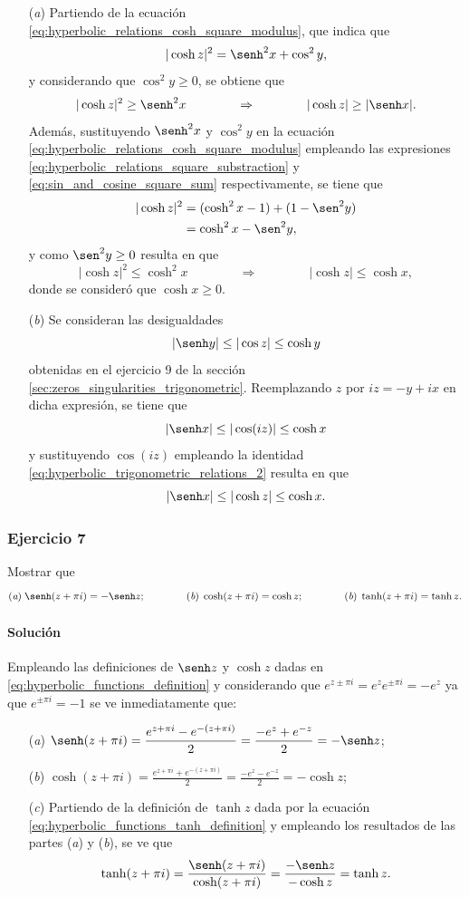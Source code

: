 \documentclass[a4paper]{report}
\begin{document}
\begin{enumerate}
 \item[(\textit{a})] Partiendo de la ecuación \ref{eq:hyperbolic_relations_cosh_square_modulus}, que indica que 
\[
 |\cosh z|^2=\senh^2x+\cos^2y,
\]
y considerando que \(\cos^2y\geq0\), se obtiene que 
\[
 |\cosh z|^2\geq\senh^2x
 \qquad\qquad\Rightarrow\qquad\qquad
 |\cosh z|\geq|\senh x|.
\]
Además, sustituyendo \(\senh^2x\) y \(\cos^2y\) en la ecuación \ref{eq:hyperbolic_relations_cosh_square_modulus} empleando las expresiones  \ref{eq:hyperbolic_relations_square_substraction} y \ref{eq:sin_and_cosine_square_sum} respectivamente, se tiene que 
\begin{align*}
 |\cosh z|^2&=(\cosh^2x-1)+(1-\sen^2y)\\ 
   &=\cosh^2x-\sen^2y,
\end{align*}
y como \(\sen^2y\geq0\) resulta en que 
\[
 |\cosh z|^2\leq\cosh^2x
 \qquad\qquad\Rightarrow\qquad\qquad
 |\cosh z|\leq\cosh x,
\]
donde se consideró que \(\cosh x\geq0\).
 \item[(\textit{b})] Se consideran las desigualdades
 \[
  |\senh y|\leq|\cos z|\leq\cosh y
 \]
 obtenidas en el ejercicio 9  de la sección \ref{sec:zeros_singularities_trigonometric}. Reemplazando \(z\) por \(iz=-y+ix\) en dicha expresión, se tiene que 
 \[
  |\senh x|\leq|\cos(iz)|\leq\cosh x
 \]
 y sustituyendo \(\cos(iz)\) empleando la identidad \ref{eq:hyperbolic_trigonometric_relations_2} resulta en que
 \[
  |\senh x|\leq|\cosh z|\leq\cosh x.
 \]
\end{enumerate}

\subsubsection{Ejercicio 7}

Mostrar que 
\[
 (\textit{a})\;\senh(z+\pi i)=-\senh z;\qquad\qquad (\textit{b})\;\cosh(z+\pi i)=\cosh z;
 \qquad\qquad (\textit{b})\;\tanh(z+\pi i)=\tanh z.
\]

\paragraph{Solución}

Empleando las definiciones de \(\senh z\) y \(\cosh z\) dadas en \ref{eq:hyperbolic_functions_definition} y considerando que \(e^{z\pm\pi i}=e^{z}e^{\pm\pi i}=-e^{z}\) ya que \(e^{\pm\pi i}=-1\) se ve inmediatamente que:
\begin{enumerate}
 \item[(\textit{a})] \(\displaystyle\senh(z+\pi i)=\frac{e^{z+\pi i}-e^{-(z+\pi i)}}{2}=\frac{-e^z+e^{-z}}{2}=-\senh z\);
 \item[(\textit{b})] \(\displaystyle\cosh(z+\pi i)=\frac{e^{z+\pi i}+e^{-(z+\pi i)}}{2}=\frac{-e^z-e^{-z}}{2}=-\cosh z\);
 \item[(\textit{c})] Partiendo de la definición de \(\tanh z\) dada por la ecuación  \ref{eq:hyperbolic_functions_tanh_definition} y empleando los resultados de las partes (\textit{a}) y (\textit{b}), se ve que 
 \[
  \tanh(z+\pi i)=\frac{\senh(z+\pi i)}{\cosh(z+\pi i)}=\frac{-\senh z}{-\cosh z}=\tanh z.
 \]
\end{enumerate}
\end{document}
